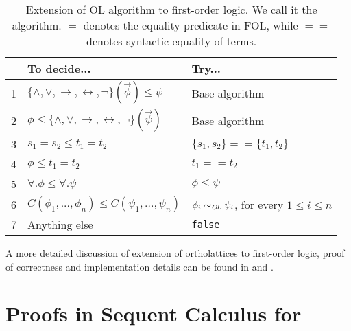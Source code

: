 \begin{table}[ht]
  \centering
  \begin{tabular}{c | l | l}
    & To decide...                                                                             & Try...                                           \\
    \hline
    1 & $\lbrace \land, \lor, \rightarrow, \leftrightarrow, \neg \rbrace(\vec{\phi}) \leq \psi $ & Base algorithm                                         \\
    2 & $\phi \leq \lbrace \land, \lor, \rightarrow, \leftrightarrow, \neg \rbrace(\vec{\psi}) $ & Base algorithm                                         \\
    3 & $s_1 = s_2 \leq t_1 = t_2$                                                               & $\lbrace s_1, s_2 \rbrace == \lbrace t_1, t_2 \rbrace$ \\
    4 & $\phi \leq t_1 = t_2$                                                                    & $t_1 == t_2$                                           \\
    5 & $\forall. \phi \leq \forall. \psi$                                                       & $\phi \leq \psi$                                       \\
    6 & $C(\phi_1,...,\phi_n) \leq C(\psi_1,...,\psi_n)$                         & $\phi_i \sim_{\mathit{O{\kern-0.1em}L}} \psi_i$, for every $1 \le i \le n$    \\

    7 & Anything else                                                                            & \lstinline|false|
  \end{tabular}

  \caption{Extension of OL algorithm to first-order logic. We call it the \FOLalg{} algorithm. $=$ denotes the equality predicate in FOL, while $==$ denotes syntactic equality of terms.
  \label{tab:Olextension}}
\end{table}

A more detailed discussion of extension of ortholattices to first-order logic, proof of correctness and implementation details can be found in \cite{guilloudFormulaNormalizationsVerification2023} and \cite{guilloudLISAModernProof2023}.

\section{Proofs in Sequent Calculus for \lambdafol}
\label{sec:proofs_lk}
